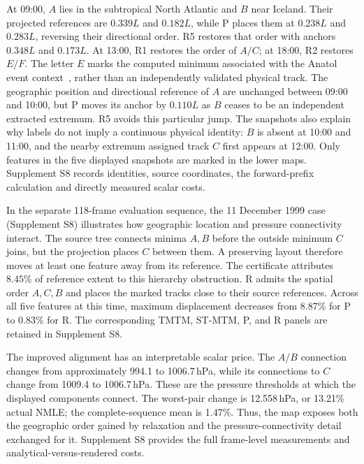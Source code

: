 At 09:00, $A$ lies in the subtropical North Atlantic and $B$ near Iceland. Their projected references are $0.339L$ and $0.182L$, while P places them at $0.238L$ and $0.283L$, reversing their directional order. R5 restores that order with anchors $0.348L$ and $0.173L$. At 13:00, R1 restores the order of $A/C$; at 18:00, R2 restores $E/F$. The letter $E$ marks the computed minimum associated with the Anatol event context~\cite{Koepp:2023:TMTM}, rather than an independently validated physical track. The geographic position and directional reference of $A$ are unchanged between 09:00 and 10:00, but P moves its anchor by $0.110L$ as $B$ ceases to be an independent extracted extremum. R5 avoids this particular jump. The snapshots also explain why labels do not imply a continuous physical identity: $B$ is absent at 10:00 and 11:00, and the nearby extremum assigned track $C$ first appears at 12:00. Only features in the five displayed snapshots are marked in the lower maps. Supplement S8 records identities, source coordinates, the forward-prefix calculation and directly measured scalar costs.

In the separate 118-frame evaluation sequence, the 11 December 1999 case (Supplement S8) illustrates how geographic location and pressure connectivity interact. The source tree connects minima $A,B$ before the outside minimum $C$ joins, but the projection places $C$ between them. A preserving layout therefore moves at least one feature away from its reference. The certificate attributes $8.45\%$ of reference extent to this hierarchy obstruction. R admits the spatial order $A,C,B$ and places the marked tracks close to their source references. Across all five features at this time, maximum displacement decreases from 8.87\% for P to 0.83\% for R. The corresponding TMTM, ST-MTM, P, and R panels are retained in Supplement S8.

The improved alignment has an interpretable scalar price. The $A/B$ connection changes from approximately 994.1 to 1006.7\,hPa, while its connections to $C$ change from 1009.4 to 1006.7\,hPa. These are the pressure thresholds at which the displayed components connect. The worst-pair change is 12.558\,hPa, or 13.21\% actual NMLE; the complete-sequence mean is 1.47\%. Thus, the map exposes both the geographic order gained by relaxation and the pressure-connectivity detail exchanged for it. Supplement S8 provides the full frame-level measurements and analytical-versus-rendered costs.


